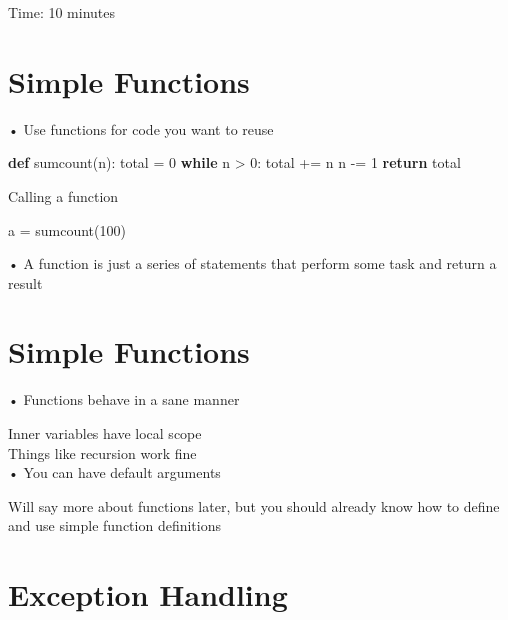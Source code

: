 \documentclass[
  letterpaper,
  DIV=11,
  numbers=noendperiod]{scrreprt}
\newenvironment{Shaded}{\begin{snugshade}}{\end{snugshade}}
\newcommand{\ControlFlowTok}[1]{\textcolor[rgb]{0.00,0.23,0.31}{\textbf{#1}}}
\newcommand{\DecValTok}[1]{\textcolor[rgb]{0.68,0.00,0.00}{#1}}
\newcommand{\KeywordTok}[1]{\textcolor[rgb]{0.00,0.23,0.31}{\textbf{#1}}}
\newcommand{\NormalTok}[1]{\textcolor[rgb]{0.00,0.23,0.31}{#1}}
\newcommand{\OperatorTok}[1]{\textcolor[rgb]{0.37,0.37,0.37}{#1}}
\begin{document}
Time: 10 minutes


\chapter{Simple Functions}\label{simple-functions}

• Use functions for code you want to reuse

\begin{Shaded}
\begin{Highlighting}[]
\KeywordTok{def}\NormalTok{ sumcount(n):}
\NormalTok{    total }\OperatorTok{=} \DecValTok{0}
    \ControlFlowTok{while}\NormalTok{ n }\OperatorTok{\textgreater{}} \DecValTok{0}\NormalTok{:}
\NormalTok{        total }\OperatorTok{+=}\NormalTok{ n}
\NormalTok{        n }\OperatorTok{{-}=} \DecValTok{1}
    \ControlFlowTok{return}\NormalTok{ total }
\end{Highlighting}
\end{Shaded}

Calling a function

\begin{Shaded}
\begin{Highlighting}[]
\NormalTok{a = sumcount(100) }
\end{Highlighting}
\end{Shaded}

• A function is just a series of statements that perform some task and
return a result


\chapter{Simple Functions}\label{simple-functions-1}

• Functions behave in a sane manner

Inner variables have local scope\\
Things like recursion work fine\\
• You can have default arguments

Will say more about functions later, but you should already know how to
define and use simple function definitions


\chapter{Exception Handling}\label{exception-handling}
\end{document}
